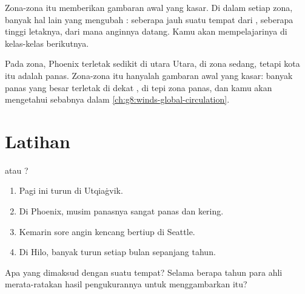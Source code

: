 Zona-zona itu memberikan gambaran awal yang kasar. Di dalam setiap zona,
banyak hal lain yang mengubah : seberapa jauh suatu tempat dari ,
seberapa tinggi letaknya, dari mana anginnya datang. Kamu akan mempelajarinya
di kelas-kelas berikutnya.

\begin{remark}\label{rem:g5:weather-and-climate:phoenix}
Pada  zona, Phoenix terletak sedikit di utara  Utara, di zona
sedang, tetapi kota itu adalah  panas. Zona-zona itu hanyalah gambaran
awal yang kasar: banyak  panas yang besar terletak di dekat , di tepi zona panas, dan kamu akan mengetahui sebabnya dalam
\cref{ch:g8:winds-global-circulation}.
\end{remark}

\section{Latihan}

\begin{exercise}[$\star$]\label{exo:g5:weather-and-climate:1}
 atau ?
\begin{enumerate}
  \item[(a)] Pagi ini  turun di Utqiaġvik.
  \item[(b)] Di Phoenix, musim panasnya sangat panas dan kering.
  \item[(c)] Kemarin sore angin kencang bertiup di Seattle.
  \item[(d)] Di Hilo, banyak  turun setiap bulan sepanjang tahun.
\end{enumerate}
\end{exercise}

\begin{exercise}[$\star$]\label{exo:g5:weather-and-climate:2}
Apa yang dimaksud dengan  suatu tempat? Selama berapa tahun para ahli
 merata-ratakan hasil pengukurannya untuk menggambarkan  itu?
\end{exercise}

